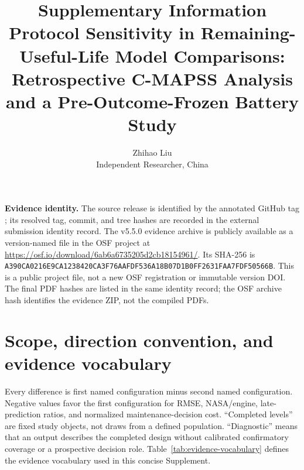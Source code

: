 \documentclass[11pt,a4paper]{article}
\title{Supplementary Information\\Protocol Sensitivity in Remaining-Useful-Life Model Comparisons: Retrospective C-MAPSS Analysis and a Pre-Outcome-Frozen Battery Study}
\author{Zhihao Liu\\\small Independent Researcher, China}
\date{}
\begin{document}

\maketitle

\noindent\textbf{Evidence identity.} The source release is identified by the annotated GitHub tag \texttt{\EvidenceSourceReleaseTag}; its resolved tag, commit, and tree hashes are recorded in the external submission identity record. The v5.5.0 evidence archive is publicly available as a version-named file in the OSF project at \url{https://osf.io/download/6ab6a6735205d2cb18154961/}. Its SHA-256 is \nolinkurl{A390CA0216E9CA1238420CA3F76AAFDF536A18B07D1B0FF2631FAA7FDF50566B}. This is a public project file, not a new OSF registration or immutable version DOI. The final PDF hashes are listed in the same identity record; the OSF archive hash identifies the evidence ZIP, not the compiled PDFs.

\tableofcontents
\clearpage

\section{Scope, direction convention, and evidence vocabulary}

Every difference is first named configuration minus second named configuration. Negative values favor the first configuration for RMSE, NASA/engine, late-prediction ratios, and normalized maintenance-decision cost. ``Completed levels'' are fixed study objects, not draws from a defined population. ``Diagnostic'' means that an output describes the completed design without calibrated confirmatory coverage or a prospective decision role. Table~\ref{tab:evidence-vocabulary} defines the evidence vocabulary used in this concise Supplement.
\end{document}
